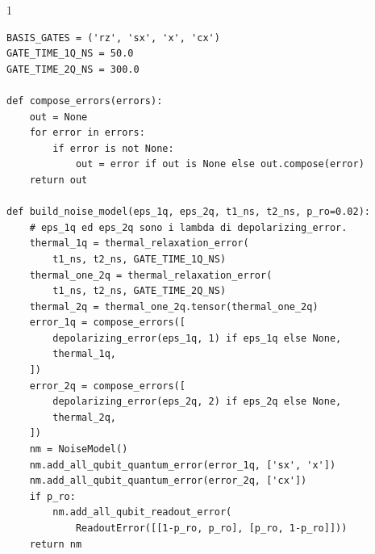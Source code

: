 \par\medskip\noindent
\begin{minipage}{\linewidth}
\begin{spacing}{1}
\begin{lstlisting}[caption={Noise model uniforme illustrativo: RZ virtuale, durate 1Q/2Q separate}, label={lst:costruzione_del_noise_model}]
BASIS_GATES = ('rz', 'sx', 'x', 'cx')
GATE_TIME_1Q_NS = 50.0
GATE_TIME_2Q_NS = 300.0

def compose_errors(errors):
    out = None
    for error in errors:
        if error is not None:
            out = error if out is None else out.compose(error)
    return out

def build_noise_model(eps_1q, eps_2q, t1_ns, t2_ns, p_ro=0.02):
    # eps_1q ed eps_2q sono i lambda di depolarizing_error.
    thermal_1q = thermal_relaxation_error(
        t1_ns, t2_ns, GATE_TIME_1Q_NS)
    thermal_one_2q = thermal_relaxation_error(
        t1_ns, t2_ns, GATE_TIME_2Q_NS)
    thermal_2q = thermal_one_2q.tensor(thermal_one_2q)
    error_1q = compose_errors([
        depolarizing_error(eps_1q, 1) if eps_1q else None,
        thermal_1q,
    ])
    error_2q = compose_errors([
        depolarizing_error(eps_2q, 2) if eps_2q else None,
        thermal_2q,
    ])
    nm = NoiseModel()
    nm.add_all_qubit_quantum_error(error_1q, ['sx', 'x'])
    nm.add_all_qubit_quantum_error(error_2q, ['cx'])
    if p_ro:
        nm.add_all_qubit_readout_error(
            ReadoutError([[1-p_ro, p_ro], [p_ro, 1-p_ro]]))
    return nm
\end{lstlisting}
\end{spacing}
\end{minipage}


